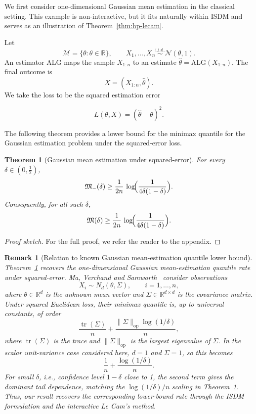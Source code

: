 \documentclass[journal]{IEEEtran}
\newtheorem{theorem}{Theorem}
\newtheorem{remark}{Remark}
\newcommand{\ALG}{\mathrm{ALG}}
\begin{document}
We first consider one-dimensional Gaussian mean estimation in the
classical setting. This example is non-interactive, but it fits naturally
within ISDM and serves as an illustration of
Theorem~\ref{thm:hp-lecam}.

Let
\[
\mathcal M=\{\theta:\theta\in\mathbb R\},
\qquad
X_1,\dots,X_n \stackrel{\mathrm{i.i.d.}}{\sim} \mathcal N(\theta,1).
\]
An estimator \(\ALG\) maps the sample \(X_{1:n}\) to an estimate
\(\hat\theta=\ALG(X_{1:n})\). The final outcome is
\[
X=(X_{1:n},\hat\theta).
\]
We take the loss to be the squared estimation error

\[
L(\theta,X)=(\hat\theta-\theta)^2.
\]

The following theorem provides a lower bound for the minimax quantile for the Gaussian estimation problem under the squared-error loss. 

\begin{theorem}[Gaussian mean estimation under squared-error]
\label{thm:nonprivate-mean}
For every \(\delta\in(0,\tfrac12)\),
\[
\mathfrak M_-(\delta)
\ge
\frac{1}{2n}\,
\log\!\Bigl(\frac{1}{4\delta(1-\delta)}\Bigr).
\]
Consequently, for all such \(\delta\),
\[
\mathfrak M(\delta)
\ge
\frac{1}{2n}\,
\log\!\Bigl(\frac{1}{4\delta(1-\delta)}\Bigr).
\]
\end{theorem}
\begin{proof}[Proof sketch]
    For the full proof, we refer the reader to the appendix.
\end{proof}

\begin{remark}[Relation to known Gaussian mean-estimation quantile lower bound]
Theorem~\ref{thm:nonprivate-mean} recovers the one-dimensional Gaussian
mean-estimation quantile rate under squared-error. Ma, Verchand and
Samworth~\cite[Prop.~10]{ma2024high} consider observations
\[
X_i\sim N_d(\theta,\Sigma), \qquad i=1,\dots,n,
\]
where \(\theta\in\mathbb R^d\) is the unknown mean vector and
\(\Sigma\in\mathbb R^{d\times d}\) is the covariance matrix. Under squared
Euclidean loss, their minimax quantile is, up to universal constants, of order
\[
\frac{\operatorname{tr}(\Sigma)}{n}
+
\frac{\|\Sigma\|_{\mathrm{op}}\log(1/\delta)}{n},
\]
where \(\operatorname{tr}(\Sigma)\) is the trace and
\(\|\Sigma\|_{\mathrm{op}}\) is the largest eigenvalue of \(\Sigma\). In the
scalar unit-variance case considered here, \(d=1\) and \(\Sigma=1\), so this
becomes
\[
\frac{1}{n}+\frac{\log(1/\delta)}{n}.
\]
For small \(\delta\), i.e., confidence level \(1-\delta\) close to 1, the
second term gives the dominant tail dependence, matching the
\(\log(1/\delta)/n\) scaling in Theorem~\ref{thm:nonprivate-mean}. Thus, our
result recovers the corresponding lower-bound rate through the ISDM formulation
and the interactive Le Cam's method. 
\end{remark}
\end{document}

